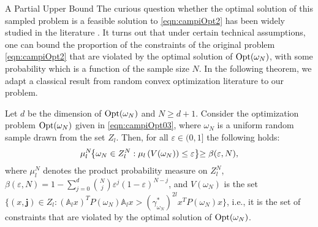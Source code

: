 \begin{subsection}{A Partial Upper Bound}
The curious question whether the optimal solution of this sampled problem is a feasible solution to \eqref{eqn:campiOpt2} has been widely studied in the literature \cite{campi}. It turns out that under certain technical assumptions, one can bound the proportion of the constraints of the original problem \eqref{eqn:campiOpt2} that are violated by the optimal solution of $\text{Opt}(\omega_N)$, with some probability which is a function of the sample size $N$. In the following theorem, we adapt a classical result from random convex optimization literature to our problem.
\begin{thm}\label{mainTheorem0}
Let $d$ be the dimension of $\text{Opt}(\omega_N)$ and $N \geq d+1$. Consider the optimization problem $\text{Opt}(\omega_N)$ given in \eqref{eqn:campiOpt03}, where $\omega_N$ is a uniform random sample drawn from the set $Z_l$.
Then, for all $\varepsilon \in (0,1]$ the following holds:
\begin{equation}\label{eqn:violation}
\mu_l^N\hspace{-1mm}\left\{ \omega_N \in Z_l^N: \mu_l \left( V(\omega_N) \right) \leq \varepsilon \right\}\hspace{-1mm} \geq \beta(\varepsilon, N),
\end{equation}
where $\mu_l^N$ denotes the product probability measure on $Z_l^N$, $\beta(\varepsilon, N) =  1- \sum_{j=0}^{d} \binom{N}{j}\varepsilon^j (1-\varepsilon)^{N-j}$, and $V(\omega_N)$ is the set $\{(x,\mathbf{j}) \in Z_l: (\mathbb{A}_l x)^T P(\omega_N) \mathbb{A}_l x > (\gamma_{\omega_N}^{*})^{2l} x^T P(\omega_N) x\}$, i.e., it is the set of constraints that are violated by the optimal solution of $\text{Opt}(\omega_N)$.
\end{thm}



\end{subsection}
